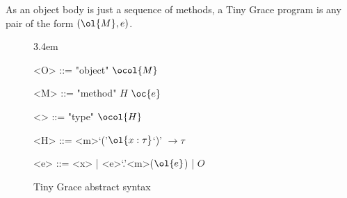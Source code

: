 As an object body is just a sequence of methods, a Tiny Grace program is any
pair of the form $(\ol{M}, e)$.

\begin{figure}
  \centering

  \grammarindent3.4em
  \renewcommand{\grammarlabel}[2]{$#1$\hfill#2}
  \renewcommand{\syntleft}{\itshape}
  \renewcommand{\syntright}{}
  \renewcommand{\ulitleft}{\sffamily\bfseries}
  \renewcommand{\litleft}{\sffamily}
  \renewcommand{\litright}{}

  \vspace{1em}
  \begin{minipage}{10.3em}
    \begin{grammar}
      <O> ::= "object" \!$\ocol{M}$

      <M> ::= "method" $H$ $\oc{e}$

      <\tau> ::= "type" \!$\ocol{H}$

      <H> ::= <m>`('$\ol{x:\tau}$`)' $\to\tau$

      <e> ::= <x> | <e>`.'<m>($\ol{e}$) | $O$
    \end{grammar}
  \end{minipage}

  \caption{Tiny Grace abstract syntax}\label{fig:abstract-syntax}
\end{figure}


